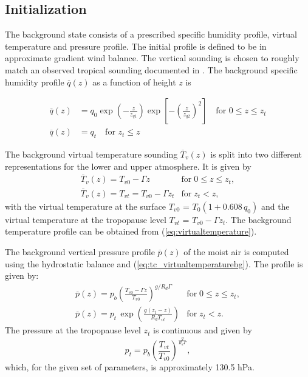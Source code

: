 \documentclass[times,doublespace]{fldauth}
\begin{document}
\subsection{Initialization}

The background state consists of a prescribed specific humidity profile, virtual temperature and pressure profile.  The initial profile is defined to be in approximate gradient wind balance.  The vertical sounding is chosen to roughly match an observed tropical sounding documented in \cite{jordan1958mean}.  The background specific humidity profile $\overline{q}(z)$ as a function of height $z$ is

\begin{equation}
\begin{split}
\overline{q}(z)&=q_0 \exp\left(- \frac{z}{z_{q1}}\right)\exp\left[-\left(\frac{z}{z_{q2}}\right)^2\right] \text{ ~~for   } 0 \leq z \leq z_t \\
\overline{q}(z)&=q_t  \text{ ~~for   }  z_t \leq z
\end{split}
\end{equation}

The background virtual temperature sounding $\overline{T}_v(z)$ is split into two different representations for the lower and upper atmosphere.  It is given by
\begin{equation}
\begin{array}{ll} \label{eq:tc_virtualtemperaturebg}
\overline{T}_v(z) = T_{v0} - \Gamma z & \mbox{for} \; 0 \le z \le z_t, \\
\overline{T}_v(z) = T_{vt} = T_{v0} - \Gamma z_t & \mbox{for} \; z_t < z, 
\end{array}
\end{equation} with the virtual temperature at the surface $T_{v0}$ = $T_0 (1+0.608 \, q_0)$ and the virtual temperature at the tropopause level $T_{vt}$ = $T_{v0} - \Gamma z_t$.  The background temperature profile can be obtained from (\ref{eq:virtualtemperature}).

The background vertical pressure profile $\overline{p}(z)$ of the moist air is computed using the hydrostatic balance and (\ref{eq:tc_virtualtemperaturebg}). The profile is given by:
\begin{equation}
\begin{array}{ll}\label{eq4}
\displaystyle \overline{p}(z) = p_b \left( \frac{T_{v0} - \Gamma z}{T_{v0}} \right )^{g / R_d \Gamma} & \mbox{for} \; 0 \le z \le z_t, \\
\displaystyle \overline{p}(z) = p_t \, \exp{\left(\frac{g (z_t - z)}{R_d T_{vt}} \right)} & \mbox{for} \; z_t < z.
\end{array}
\end{equation}  The pressure at the tropopause level $z_t$ is continuous and given by 
\begin{equation}\label{eq4.5}
p_t = p_b \left( \frac{T_{vt}}{T_{v0}} \right )^{\frac{g}{R_d \Gamma}},
\end{equation}
which, for the given set of parameters, is approximately 130.5 hPa. 
\end{document}
